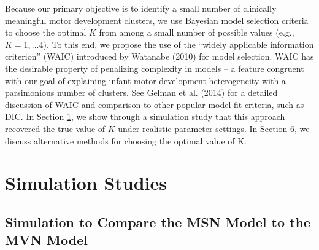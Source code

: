 \documentclass[useAMS,referee]{biom}
\begin{document}
Because our primary objective is to identify a small number of clinically meaningful motor development clusters, we use Bayesian model selection criteria to choose the optimal $K$ from among a small number of possible values (e.g., $K=1,...4$). To this end, we propose the use of the ``widely applicable information criterion'' (WAIC) introduced by Watanabe (2010) for model selection. WAIC has the desirable property of penalizing complexity in models -- a feature congruent with our goal of explaining infant motor development heterogeneity with a parsimonious number of clusters. See Gelman et al. (2014) for a detailed discussion of WAIC and comparison to other popular model fit criteria, such as DIC. In Section \ref{s:sim}, we show through a simulation study that this approach recovered the true value of $K$ under realistic parameter settings. In Section 6, we discuss alternative methods for choosing the optimal value of K.

\newpage

\section{Simulation Studies}
\label{s:sim}

\subsection{Simulation to Compare the MSN Model to the MVN Model}
\end{document}
